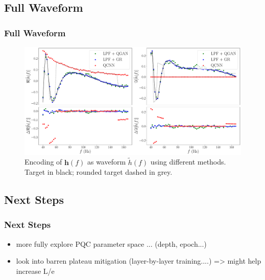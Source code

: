 \documentclass{beamer}
\begin{document}
\begin{frame}
\subsection{Full Waveform}
\frametitle{Full Waveform}
\begin{figure}[h]
\centering
\includegraphics[width=\textwidth]{im/h_comp}
\caption{Encoding of $\boldsymbol{h}(f)$ as waveform $\tilde{h}(f)$ using different methods. Target in black; rounded target dashed in grey.}
\end{figure}
\end{frame}

\begin{frame}
\section{Next Steps}
\frametitle{Next Steps}
\begin{itemize}
\item more fully explore PQC parameter space ... (depth, epoch...)
\item look into barren plateau mitigation (layer-by-layer training....) => might help increase L/e
\end{itemize}
\end{frame}
\end{document}
